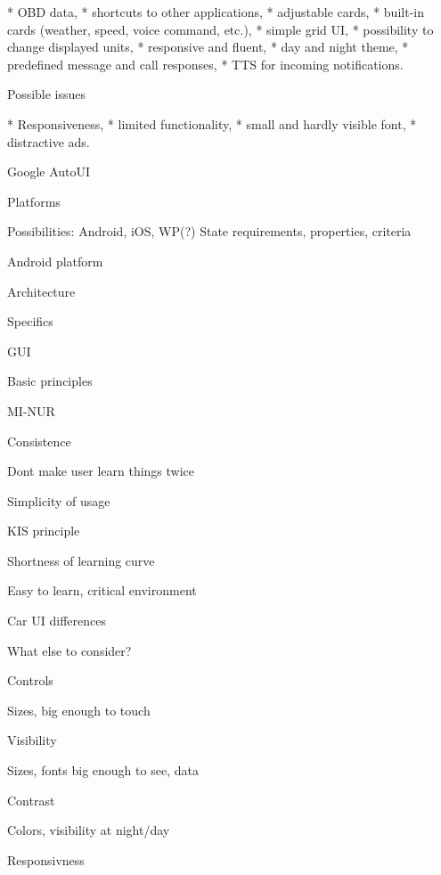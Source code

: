 \begitems
* OBD data,
* shortcuts to other applications,
* adjustable cards,
* built-in cards (weather, speed, voice command, etc.),
* simple grid UI,
* possibility to change displayed units,
* responsive and fluent,
* day and night theme,
* predefined message and call responses,
* TTS for incoming notifications.
\enditems

\seccc Possible issues

\begitems
* Responsiveness,
* limited functionality,
* small and hardly visible font,
* distractive ads.
\enditems

\secc Google AutoUI


\sec Platforms

Possibilities: Android, iOS, WP(?)
State requirements, properties, criteria

\sec Android platform


\secc Architecture


\secc Specifics


\sec GUI


\secc Basic principles

MI-NUR           

\seccc Consistence

Dont make user learn things twice

\seccc Simplicity of usage

KIS principle

\seccc Shortness of learning curve

Easy to learn, critical environment

\secc Car UI differences

What else to consider?

\seccc Controls

Sizes, big enough to touch 

\seccc Visibility

Sizes, fonts big enough to see, data

\seccc Contrast

Colors, visibility at night/day

\seccc Responsivness

